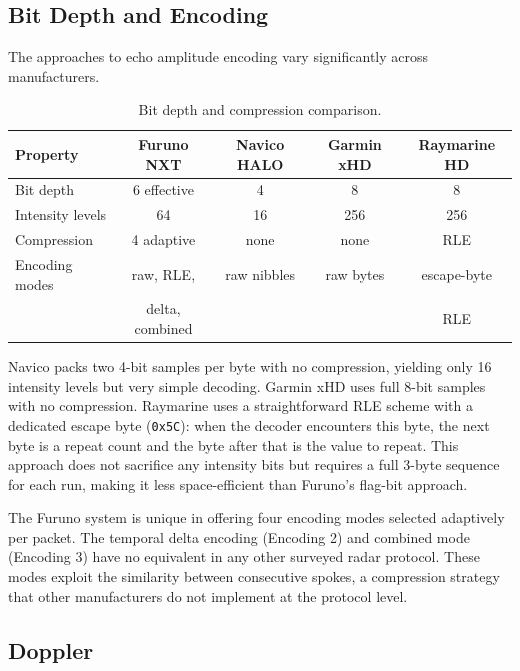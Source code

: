 \documentclass[11pt,letterpaper]{article}
\begin{document}
\subsection{Bit Depth and Encoding}

The approaches to echo amplitude encoding vary significantly across manufacturers.

\begin{table}[H]
\centering
\caption{Bit depth and compression comparison.}
\label{tab:compare-encoding}
\begin{tabular}{@{}lcccc@{}}
\toprule
\textbf{Property} & \textbf{Furuno NXT} & \textbf{Navico HALO} & \textbf{Garmin xHD} & \textbf{Raymarine HD} \\
\midrule
Bit depth          & 6 effective    & 4              & 8              & 8 \\
Intensity levels   & 64             & 16             & 256            & 256 \\
Compression        & 4 adaptive     & none           & none           & RLE \\
Encoding modes     & raw, RLE,      & raw nibbles    & raw bytes      & escape-byte \\
                   & delta, combined &                &                & RLE \\
\bottomrule
\end{tabular}
\end{table}

Navico packs two 4-bit samples per byte with no compression, yielding only 16 intensity levels but very simple decoding. Garmin xHD uses full 8-bit samples with no compression. Raymarine uses a straightforward RLE scheme with a dedicated escape byte (\texttt{0x5C}): when the decoder encounters this byte, the next byte is a repeat count and the byte after that is the value to repeat. This approach does not sacrifice any intensity bits but requires a full 3-byte sequence for each run, making it less space-efficient than Furuno's flag-bit approach.

The Furuno system is unique in offering four encoding modes selected adaptively per packet. The temporal delta encoding (Encoding 2) and combined mode (Encoding 3) have no equivalent in any other surveyed radar protocol. These modes exploit the similarity between consecutive spokes, a compression strategy that other manufacturers do not implement at the protocol level.

\subsection{Doppler}
\end{document}

